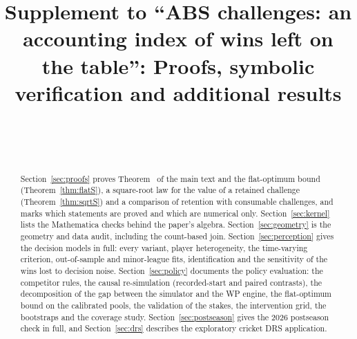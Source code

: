 \documentclass[aoas]{imsart}
\theoremstyle{plain}
\theoremstyle{definition}
\begin{document}
\nocite{Savant2026abs,SavantCSV2026,Tango2026costbenefit,Tango2026naive}

\begin{frontmatter}
\title{Supplement to ``ABS challenges: an accounting index of wins left on the table'': Proofs, symbolic verification and additional results}

\begin{aug}
\author[A]{~}
\author[A]{~}
\address[A]{Department of Probability and Mathematical Statistics, Faculty of Mathematics and Physics, Charles
University, Prague, Czech Republic}
\end{aug}

\begin{abstract}
Section~\ref{sec:proofs} proves Theorem~ of the main text and the flat-optimum bound (Theorem~\ref{thm:flatS}), a square-root law
for the value of a retained challenge (Theorem~\ref{thm:sqrtS}) and a comparison of retention with consumable
challenges, and marks which statements are proved and which are numerical only.
Section~\ref{sec:kernel} lists the Mathematica checks behind the paper's algebra. Section~\ref{sec:geometry} is the
geometry and data audit, including the count-based join. Section~\ref{sec:perception} gives the decision models in
full: every variant, player heterogeneity, the time-varying criterion, out-of-sample and minor-league fits,
identification and the sensitivity of the wins lost to decision noise. Section~\ref{sec:policy} documents the policy
evaluation: the competitor rules, the causal re-simulation (recorded-start and paired contrasts), the decomposition of
the gap between the simulator and the WP engine, the flat-optimum bound on the calibrated pools, the validation of the
stakes, the intervention grid, the bootstraps and the coverage study. Section~\ref{sec:postseason} gives the 2026 postseason check in full, and Section~\ref{sec:drs}
describes the exploratory cricket DRS application.
\end{abstract}

\end{frontmatter}
\end{document}
